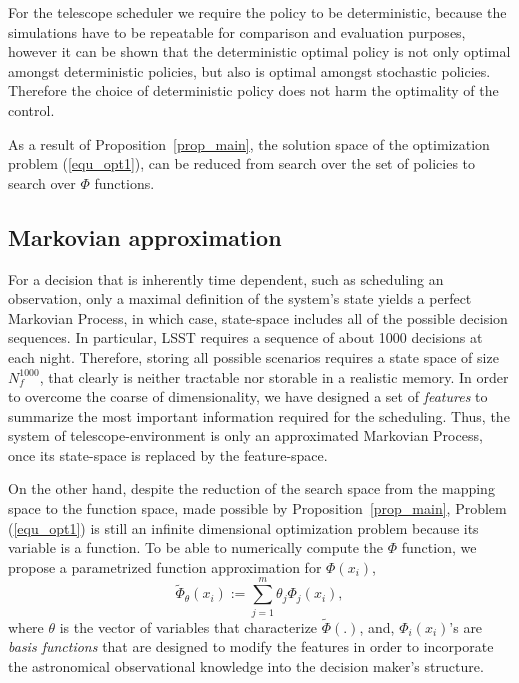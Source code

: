 \documentclass[12pt]{aastex62}
\theoremstyle{definition}
\begin{document}
For the telescope scheduler we require the policy to be deterministic, because the simulations have to be repeatable for comparison and evaluation purposes, however it can be shown that the deterministic optimal policy is not only optimal amongst deterministic policies, but also is optimal amongst stochastic policies. Therefore the choice of deterministic policy does not harm the optimality of the control.

As a result of Proposition~\ref{prop_main}, the solution space of the optimization problem (\ref{equ_opt1}), can be reduced from search over the set of policies to search over $\Phi$ functions.


\subsection{Markovian approximation}\label{sec_Markov_approx}

For a decision that is inherently time dependent, such as scheduling an observation, only a maximal definition of the system's state yields a perfect Markovian Process, in which case, state-space includes all of the possible decision sequences. In particular, LSST requires a sequence of about 1000 decisions at each night. Therefore, storing all possible scenarios requires a state space of size $N_{f}^{1000}$, that clearly is neither tractable nor storable in a realistic memory. In order to overcome the coarse of dimensionality, we have designed a set of   \textit{features} to summarize the most important information required for the scheduling. Thus, the system of telescope-environment is only an approximated Markovian Process, once its state-space is replaced by the feature-space. 

On the other hand, despite the reduction of the search space from the mapping space to the function space, made possible by Proposition~\ref{prop_main}, Problem (\ref{equ_opt1}) is still an infinite dimensional optimization problem because its variable is a function. To be able to numerically compute the $\Phi$ function, we propose a parametrized function approximation for $\Phi(x_{i})$,
\begin{equation*}
 \tilde{\Phi}_{\theta}({x}_{i}) := \sum_{j=1}^m \theta_j \Phi_j(x_{i}),
\end{equation*}
where $\theta$ is the vector of variables that characterize $\tilde{\Phi}(.)$, and, $\Phi_i(x_i)$'s are \textit{basis functions} that are designed to modify the features in order to incorporate the astronomical observational knowledge into the decision maker's structure.
\end{document}

